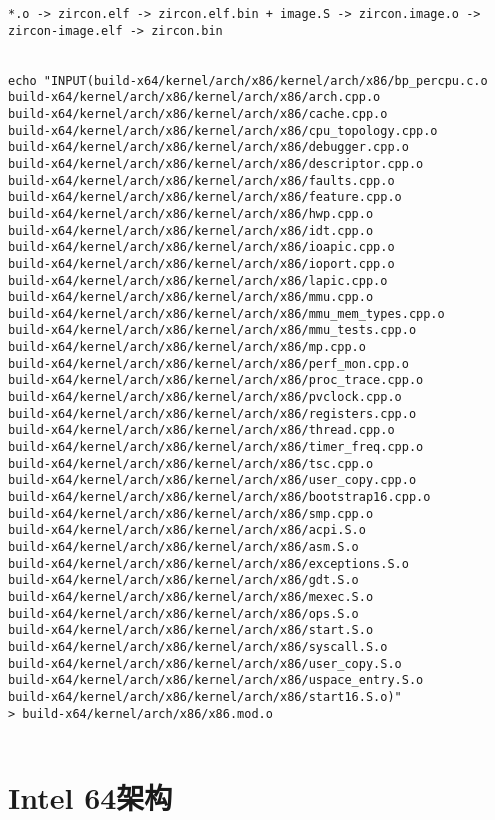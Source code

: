 \begin{verbatim}
*.o -> zircon.elf -> zircon.elf.bin + image.S -> zircon.image.o -> zircon-image.elf -> zircon.bin


echo "INPUT(build-x64/kernel/arch/x86/kernel/arch/x86/bp_percpu.c.o 
build-x64/kernel/arch/x86/kernel/arch/x86/arch.cpp.o 
build-x64/kernel/arch/x86/kernel/arch/x86/cache.cpp.o 
build-x64/kernel/arch/x86/kernel/arch/x86/cpu_topology.cpp.o 
build-x64/kernel/arch/x86/kernel/arch/x86/debugger.cpp.o 
build-x64/kernel/arch/x86/kernel/arch/x86/descriptor.cpp.o 
build-x64/kernel/arch/x86/kernel/arch/x86/faults.cpp.o 
build-x64/kernel/arch/x86/kernel/arch/x86/feature.cpp.o 
build-x64/kernel/arch/x86/kernel/arch/x86/hwp.cpp.o 
build-x64/kernel/arch/x86/kernel/arch/x86/idt.cpp.o
build-x64/kernel/arch/x86/kernel/arch/x86/ioapic.cpp.o 
build-x64/kernel/arch/x86/kernel/arch/x86/ioport.cpp.o 
build-x64/kernel/arch/x86/kernel/arch/x86/lapic.cpp.o 
build-x64/kernel/arch/x86/kernel/arch/x86/mmu.cpp.o 
build-x64/kernel/arch/x86/kernel/arch/x86/mmu_mem_types.cpp.o 
build-x64/kernel/arch/x86/kernel/arch/x86/mmu_tests.cpp.o 
build-x64/kernel/arch/x86/kernel/arch/x86/mp.cpp.o 
build-x64/kernel/arch/x86/kernel/arch/x86/perf_mon.cpp.o 
build-x64/kernel/arch/x86/kernel/arch/x86/proc_trace.cpp.o 
build-x64/kernel/arch/x86/kernel/arch/x86/pvclock.cpp.o 
build-x64/kernel/arch/x86/kernel/arch/x86/registers.cpp.o 
build-x64/kernel/arch/x86/kernel/arch/x86/thread.cpp.o 
build-x64/kernel/arch/x86/kernel/arch/x86/timer_freq.cpp.o
build-x64/kernel/arch/x86/kernel/arch/x86/tsc.cpp.o 
build-x64/kernel/arch/x86/kernel/arch/x86/user_copy.cpp.o 
build-x64/kernel/arch/x86/kernel/arch/x86/bootstrap16.cpp.o 
build-x64/kernel/arch/x86/kernel/arch/x86/smp.cpp.o 
build-x64/kernel/arch/x86/kernel/arch/x86/acpi.S.o 
build-x64/kernel/arch/x86/kernel/arch/x86/asm.S.o 
build-x64/kernel/arch/x86/kernel/arch/x86/exceptions.S.o 
build-x64/kernel/arch/x86/kernel/arch/x86/gdt.S.o 
build-x64/kernel/arch/x86/kernel/arch/x86/mexec.S.o 
build-x64/kernel/arch/x86/kernel/arch/x86/ops.S.o 
build-x64/kernel/arch/x86/kernel/arch/x86/start.S.o 
build-x64/kernel/arch/x86/kernel/arch/x86/syscall.S.o 
build-x64/kernel/arch/x86/kernel/arch/x86/user_copy.S.o 
build-x64/kernel/arch/x86/kernel/arch/x86/uspace_entry.S.o 
build-x64/kernel/arch/x86/kernel/arch/x86/start16.S.o)" 
> build-x64/kernel/arch/x86/x86.mod.o


\end{verbatim}

\section{Intel 64架构}

